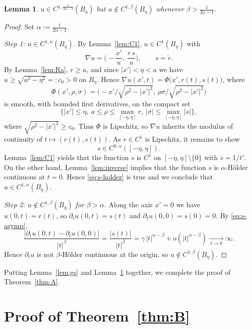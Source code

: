 \documentclass[12pt,letterpaper]{amsart}
\theoremstyle{definition}
\theoremstyle{plain}
\newtheorem{lemma}[definition]{Lemma}
\numberwithin{equation}{section}
\newcommand{\D}{\nabla}
\begin{document}
\begin{lemma}\label{lem:reg}
    $u\in C^{1,\frac{1}{2n-1}}(B_\eta)$ but $u\notin C^{1,\beta}(B_\eta)$ whenever $\beta>\frac{1}{2n-1}$.
\end{lemma}
\begin{proof}
    Set $\alpha:=\frac1{2n-1}$.

    {\it Step 1: $u\in C^{1,\alpha}(B_\eta)$.} By Lemma~\ref{lem:C1}, $u\in C^1(B_\eta)$ with
    \[
        \D u=\Big(-\frac{x'}{u},\ \frac{r\,s}{u}\Big),\qquad s=\dot r .
    \]
    By Lemma~\ref{lem:Ra}, $r\geq a$, and since $|x'|<\eta<a$ we have
    $u\geq\sqrt{a^2-\eta^2}=:c_0>0$ on $B_\eta$. Hence
    $\D u(x',t)=\Phi\big(x',r(t),s(t)\big)$, where
    \[
\Phi(x',\rho,\sigma)=\big(-x'/\sqrt{\rho^2-|x'|^2},\ \rho\sigma/\sqrt{\rho^2-|x'|^2}\big)
    \]
    is
    smooth, with bounded first derivatives, on the compact set
    \[
\{|x'|\leq\eta,\ a\leq\rho\leq\max_{[-\eta,\eta]}r,\ |\sigma|\leq\max_{[-\eta,\eta]}|s|\},
    \]
    where $\sqrt{\rho^2-|x'|^2}\geq c_0$. Thus $\Phi$ is Lipschitz, so $\D u$ inherits the
    modulus of continuity of $t\mapsto(r(t),s(t))$. As $r\in C^1$ is Lipschitz, it remains to show
    \begin{equation}\label{eq:s-holder}
        s\in C^{0,\alpha}([-\eta,\eta]).
    \end{equation}
    Lemma~\ref{lem:C1} yields that the function $s$ is $C^1$ on $[-\eta,\eta]\setminus\{0\}$ with $\dot s=1/t'$.
    On the other hand, Lemma~\ref{lem:inverse} implies that the function $s$ is $\alpha$-H\"older continuous at $t=0$.
    Hence \eqref{eq:s-holder} is true and we conclude that $u\in C^{1,\alpha}(B_\eta)$.

    {\it Step 2: $u\notin C^{1,\beta}(B_\eta)$ for $\beta>\alpha$.} Along the axis $x'=0$ we have
    $u(0,t)=r(t)$, so $\partial_t u(0,t)=s(t)$ and $\partial_t u(0,0)=s(0)=0$. By
    \eqref{eq:s-asymp},
    \[
        \frac{|\partial_t u(0,t)-\partial_t u(0,0)|}{|t|^{\beta}}
        =\frac{|s(t)|}{|t|^{\beta}}=\gamma\,|t|^{\alpha-\beta}+o(|t|^{\alpha-\beta})
        \xrightarrow[\;t\to0\;]{}\infty .
    \]
    Hence $\partial_t u$ is not $\beta$-H\"older continuous at the origin, so
    $u\notin C^{1,\beta}(B_\eta)$.
\end{proof}

Putting Lemma~\ref{lem:gs} and Lemma~\ref{lem:reg} together, we complete the proof of Theorem~\ref{thm:A}.



\section{Proof of Theorem~\ref{thm:B}}\label{sec:thmB}
\end{document}
